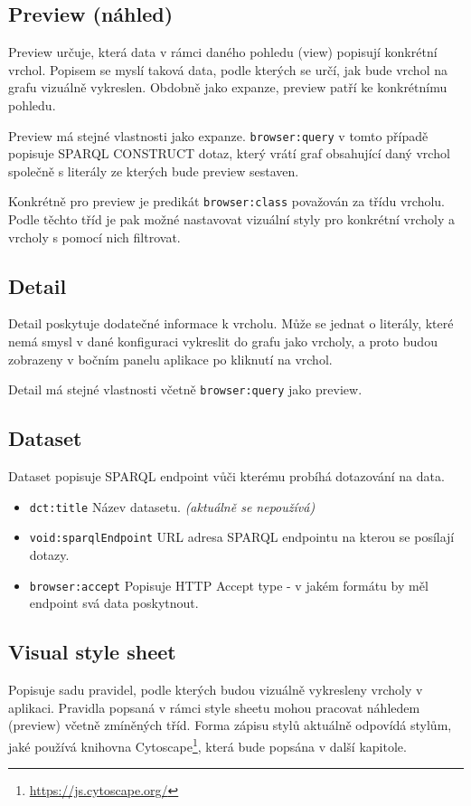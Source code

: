 \subsection{Preview (náhled)} \label{pozadavky-preview}
Preview určuje, která data v rámci daného pohledu (view) popisují konkrétní vrchol. Popisem se myslí taková data, podle kterých se určí, jak bude vrchol na grafu vizuálně vykreslen. Obdobně jako expanze, preview patří ke konkrétnímu pohledu.

Preview má stejné vlastnosti jako expanze. \texttt{browser:query} v tomto případě popisuje SPARQL CONSTRUCT dotaz, který vrátí graf obsahující daný vrchol společně s literály ze kterých bude preview sestaven.

Konkrétně pro preview je predikát \texttt{browser:class} považován za třídu vrcholu. Podle těchto tříd je pak možné nastavovat vizuální styly pro konkrétní vrcholy a vrcholy s pomocí nich filtrovat.

\subsection{Detail} \label{pozadavky-detail}
Detail poskytuje dodatečné informace k vrcholu. Může se jednat o literály, které nemá smysl v dané konfiguraci vykreslit do grafu jako vrcholy, a proto budou zobrazeny v bočním panelu aplikace po kliknutí na vrchol.

Detail má stejné vlastnosti včetně \texttt{browser:query} jako preview.

\subsection{Dataset} \label{pozadavky-dataset}
Dataset popisuje SPARQL endpoint vůči kterému probíhá dotazování na data.

\begin{itemize}
    \item \texttt{dct:title} Název datasetu. \textit{(aktuálně se nepoužívá)}
    \item \texttt{void:sparqlEndpoint} URL adresa SPARQL endpointu na kterou se posílají dotazy.
    \item \texttt{browser:accept} Popisuje HTTP Accept type - v jakém formátu by měl endpoint svá data poskytnout.
\end{itemize}

\subsection{Visual style sheet} \label{pozadavky-visual-style-sheet}
Popisuje sadu pravidel, podle kterých budou vizuálně vykresleny vrcholy v aplikaci. Pravidla popsaná v rámci style sheetu mohou pracovat náhledem (preview) včetně zmíněných tříd. Forma zápisu stylů aktuálně odpovídá stylům, jaké používá knihovna Cytoscape\footnote{\url{https://js.cytoscape.org/}}, která bude popsána v další kapitole.

